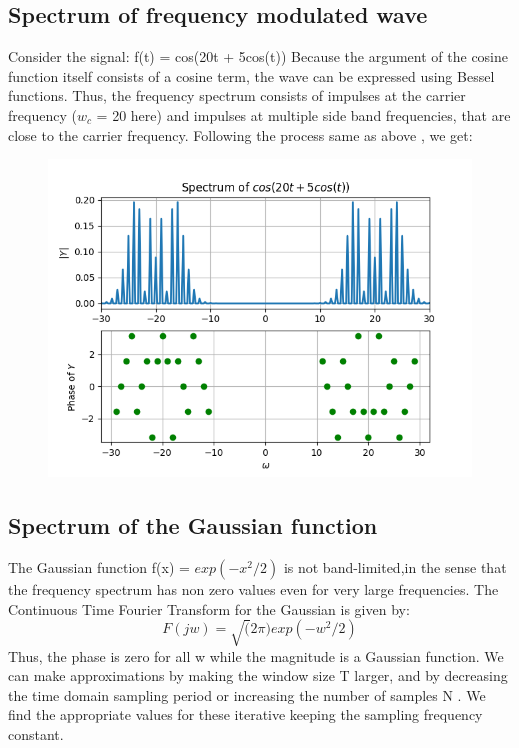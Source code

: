 \documentclass[11pt, a4paper]{article}
\begin{document}
\subsection*{Spectrum of frequency modulated wave}
Consider the signal:
\newline
f(t) = cos(20t + 5cos(t))
\newline
Because the argument of the cosine function itself consists of a cosine term, the wave can be expressed using Bessel functions. Thus, the frequency spectrum consists of impulses at the carrier frequency ($w_c$ = 20 here) and impulses at multiple side band frequencies, that are close to the carrier frequency.
\newline
Following the process same as above , we get:
\begin{figure}[!tbh]
\centering
\includegraphics[scale=0.75]{assgn9_plot7.png} 
\label{fig7}
\end{figure} 

\subsection*{Spectrum of the Gaussian function}
The Gaussian function f(x) = $exp(-x^2/2)$ is not band-limited,in the sense that the frequency spectrum has non zero values even for very large frequencies. The Continuous Time Fourier Transform for the Gaussian is given by:
\begin{equation*}
F(jw)=\sqrt(2\pi) exp(-w^2 /2)
\end{equation*}
Thus, the phase is zero for all w while the magnitude is a Gaussian function.
\newline
We can make approximations by making the window size T larger, and by decreasing the time domain sampling period or increasing the number of samples N . We find the appropriate values for these iterative keeping the sampling frequency constant.
\end{document}
